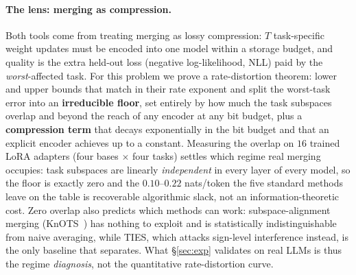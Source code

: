 \paragraph{The lens: merging as compression.} Both tools come from
treating merging as lossy compression: $T$ task-specific weight
updates must be encoded into one model within a storage budget, and
quality is the extra held-out loss (negative log-likelihood, NLL) paid
by the \emph{worst}-affected task. For this problem we prove a
rate-distortion theorem: lower and upper bounds that match in their
rate exponent and split the worst-task error into an
\textbf{irreducible floor}, set entirely
by how much the task subspaces overlap and beyond the reach of any
encoder at any bit budget, plus a \textbf{compression term} that
decays exponentially in the bit budget and that an explicit encoder
achieves up to a constant. Measuring the overlap on $16$ trained LoRA
adapters (four bases $\times$ four tasks) settles which regime real
merging occupies: task subspaces are linearly \emph{independent} in
every layer of every model, so the floor is exactly zero and the
$0.10$--$0.22$ nats/token the five standard methods leave on the table
is recoverable algorithmic slack, not an information-theoretic cost. Zero overlap also predicts which methods
can work: subspace-alignment merging (KnOTS~\citep{stoica2025knots})
has nothing to exploit and is statistically indistinguishable from
naive averaging, while TIES, which attacks sign-level interference
instead, is the only baseline that separates. What \S\ref{sec:exp}
validates on real LLMs is thus the regime \emph{diagnosis}, not the
quantitative rate-distortion curve.

